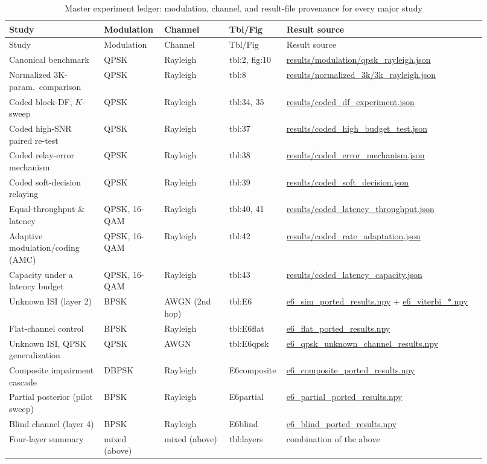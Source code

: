 {\footnotesize
\begin{longtable}[]{@{}p{0.19\linewidth}p{0.11\linewidth}p{0.13\linewidth}p{0.09\linewidth}p{0.40\linewidth}@{}}
\caption[Master experiment ledger]{Master experiment ledger: modulation, channel, and result-file provenance for every major study}\label{tbl:ledger}\tabularnewline
\toprule\noalign{}
Study & Modulation & Channel & Tbl/Fig & Result source \\
\midrule\noalign{}
\endfirsthead
\toprule\noalign{}
Study & Modulation & Channel & Tbl/Fig & Result source \\
\midrule\noalign{}
\endhead
\bottomrule\noalign{}
\endlastfoot
Canonical benchmark & QPSK & Rayleigh & tbl:2, fig:10 & \url{results/modulation/qpsk_rayleigh.json} \\
Normalized 3K-param.\ comparison & QPSK & Rayleigh & tbl:8 & \url{results/normalized_3k/3k_rayleigh.json} \\
Coded block-DF, $K$-sweep & QPSK & Rayleigh & tbl:34, 35 & \url{results/coded_df_experiment.json} \\
Coded high-SNR paired re-test & QPSK & Rayleigh & tbl:37 & \url{results/coded_high_budget_test.json} \\
Coded relay-error mechanism & QPSK & Rayleigh & tbl:38 & \url{results/coded_error_mechanism.json} \\
Coded soft-decision relaying & QPSK & Rayleigh & tbl:39 & \url{results/coded_soft_decision.json} \\
Equal-throughput \& latency & QPSK, 16-QAM & Rayleigh & tbl:40, 41 & \url{results/coded_latency_throughput.json} \\
Adaptive modulation/coding (AMC) & QPSK, 16-QAM & Rayleigh & tbl:42 & \url{results/coded_rate_adaptation.json} \\
Capacity under a latency budget & QPSK, 16-QAM & Rayleigh & tbl:43 & \url{results/coded_latency_capacity.json} \\
Unknown ISI (layer 2) & BPSK & AWGN (2nd hop) & tbl:E6 & \url{e6_sim_ported_results.npy} + \url{e6_viterbi_*.npy} \\
Flat-channel control & BPSK & Rayleigh & tbl:E6flat & \url{e6_flat_ported_results.npy} \\
Unknown ISI, QPSK generalization & QPSK & AWGN & tbl:E6qpsk & \url{e6_qpsk_unknown_channel_results.npy} \\
Composite impairment cascade & DBPSK & Rayleigh & E6composite & \url{e6_composite_ported_results.npy} \\
Partial posterior (pilot sweep) & BPSK & Rayleigh & E6partial & \url{e6_partial_ported_results.npy} \\
Blind channel (layer 4) & BPSK & Rayleigh & E6blind & \url{e6_blind_ported_results.npy} \\
Four-layer summary & mixed (above) & mixed (above) & tbl:layers & combination of the above \\
\end{longtable}
}

